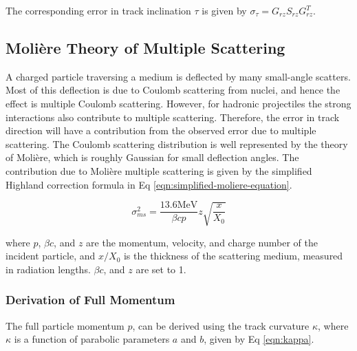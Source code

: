 The corresponding error in track inclination $\tau$ is given by $\sigma_{\tau} = G_{rz} S_{rz} G_{rz}^{T}$.




\subsection{Moli\`ere Theory of Multiple Scattering}

A charged particle traversing a medium is deflected by many small-angle scatters. Most of this deflection is due to Coulomb scattering from nuclei, and hence the effect is multiple Coulomb scattering. However, for hadronic projectiles the strong interactions also contribute to multiple scattering. Therefore, the error in track direction will have a contribution from the observed error due to multiple scattering. The Coulomb scattering distribution is well represented by the theory of Moli\`ere, which is roughly Gaussian for small deflection angles. The contribution due to Moli\`ere multiple scattering is given by the simplified Highland correction formula \cite{moliere-theory-formula} in Eq \eqref{eqn:simplified-moliere-equation}.



\begin{equation}
    \sigma_{ms}^{2} = \frac{13.6 \text{MeV}}{\beta c p} z \sqrt{\frac{x}{X_0}}
    \label{eqn:simplified-moliere-equation}
\end{equation}

where $p$, $\beta c$, and $z$ are the momentum, velocity, and charge number of the incident particle, and $x/X_0$ is the thickness of the scattering medium, measured in radiation lengths. $\beta c$, and $z$ are set to 1. 

\subsubsection{Derivation of Full Momentum}
The full particle momentum $p$, can be derived using the track curvature $\kappa$, where $\kappa$ is a function of parabolic parameters $a$ and $b$, given by Eq \eqref{eqn:kappa}. 

